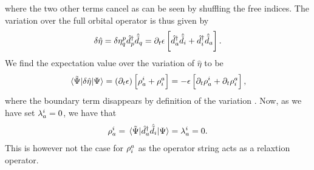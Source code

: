             where the two other terms cancel as can be seen by shuffling the
            free indices.
            The variation over the full orbital operator is thus given by
            \begin{align}
                \delta\hat{\eta}
                = \delta\eta^{p}_{q}\hat{d}^{\dagger}_{p}\hat{\tilde{d}}_{q}
                = \partial_t\epsilon\left[ 
                    \hat{d}^{\dagger}_{a}\hat{\tilde{d}}_{i}
                    + \hat{d}^{\dagger}_{i}\hat{\tilde{d}}_{a}
                 \right].
            \end{align}
            We find the expectation value over the variation of $\hat{\eta}$ to
            be
            \begin{align}
                \mel*{\tilde{\Psi}}{\delta\hat{\eta}}{\Psi}
                = \left( \partial_t\epsilon \right)
                \left[ 
                    \rho^{i}_{a}
                    + \rho^{a}_{i}
                 \right]
                =
                -\epsilon\left[ 
                    \partial_t\rho^{i}_{a}
                    + \partial_t\rho^{a}_{i}
                 \right],
            \end{align}
            where the boundary term disappears by definition of the variation
            \cite{kvaal2012ab}.
            Now, as we have set $\lambda^{i}_{a} = 0$, we have that
            \begin{align}
                \rho^{i}_{a}
                = \mel*{\tilde{\Psi}}{\hat{d}^{\dagger}_{a}\hat{\tilde{d}}_{i}}{\Psi}
                = \lambda^{i}_{a}
                = 0.
            \end{align}
            This is however not the case for $\rho^{a}_{i}$ as the
            operator string acts as a relaxtion operator.

